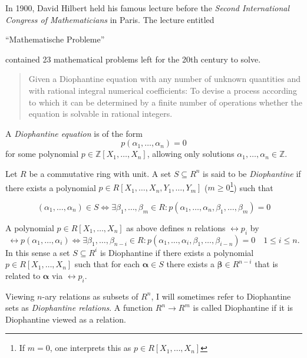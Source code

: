 
In 1900, David Hilbert held his famous lecture before the \emph{Second
International Congress of Mathematicians} in Paris. The lecture entitled
\begin{german}\enquote{Mathematische Probleme}\end{german} contained 23
mathematical problems left for the 20th century to solve.

\begin{quotation}
    Given a Diophantine equation with any number of unknown quantities and with rational integral numerical coefficients: To devise a process according to which it can be determined by a finite number of operations whether the equation is solvable in rational integers.
\end{quotation}

A \emph{Diophantine equation} is of the form
%
\[ p(α_1, …, α_n) = 0 \]
%
for some polynomial $p ∈ ℤ[X_1, …, X_n]$, allowing only solutions $α_1,…,α_n ∈ ℤ$.


\begin{defin}
    Let $R$ be a commutative ring with unit. A set $S \subseteq R^n$ is said to
    be \emph{Diophantine} if there exists a polynomial $p ∈ R[X_1,…,X_n,
    Y_1,…,Y_m]$ ($m ≥ 0$\footnote{If $m = 0$, one interprets this as $p ∈
    R[X_1,…,X_n]$}) such that

    \[ (α_1,…,α_n) ∈ S \Leftrightarrow ∃ β_1,…,β_m ∈ R: p(α_1,…,α_n,β_1,…,β_m) = 0 \]
\end{defin}

A polynomial $p ∈ R[X_1, …, X_n]$ as above defines $n$ relations $\rel{p}_i$ by
\[
  \rel{p}(α_1, …, α_i)  \Leftrightarrow
   ∃ β_1, …, β_{n - i} ∈ R : p(α_1, …, α_i, β_1, …, β_{i - n}) = 0 \quad
   1 ≤ i ≤ n.
\]
In this sense a set $S \subseteq R^i$ is Diophantine if there exists a
polynomial $p ∈ R[X_1, …, X_n]$ such that for each $\mathbf α ∈ S$ there exists
a $\mathbf β ∈ R^{n - i}$ that is related to $\mathbf α$ via $\rel p_i$.

Viewing $n$-ary relations as subsets of $R^n$, I will sometimes refer to
Diophantine sets as \emph{Diophantine relations}. A function $R^n → R^m$ is
called Diophantine if it is Diophantine viewed as a relation.

